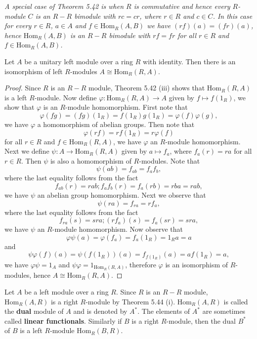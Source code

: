 \begin{note}\em
A special case of Theorem 5.42 is when $R$ is commutative and hence every $R$-module $C$ is an $R-R$ bimodule with $rc=cr$, where $r\in R$ and $c\in C$. In this case for every $r\in R$, $a\in A$ and $f\in\mathrm{Hom}_R(A,B)$ we have $(rf)(a)=(fr)(a)$, hence $\mathrm{Hom}_R(A,B)$ is an $R-R$ bimodule with $rf=fr$ for all $r\in R$ and $f\in\mathrm{Hom}_R(A,B)$.
\end{note}
\begin{theorem}
Let $A$ be a unitary left module over a ring $R$ with identity. Then there is an isomorphism of left $R$-modules $A\cong\mathrm{Hom}_R(R,A)$.
\end{theorem}
\begin{proof}
Since $R$ is an $R-R$ module, Theorem 5.42 (iii) shows that $\mathrm{Hom}_R(R,A)$ is a left $R$-module. Now define $\varphi:\mathrm{Hom}_R(R,A)\to A$ given by $f\mapsto f(1_R)$, we show that $\varphi$ is an $R$-module homomorphism. First note that 
$$
\varphi \left( fg \right) =\left( fg \right) \left( 1_R \right) =f\left( 1_R \right) g\left( 1_R \right) =\varphi \left( f \right) \varphi \left( g \right) ,
$$
we have $\varphi$ a homomorphism of abelian groups. Then note that 
$$
\varphi \left( rf \right) =rf\left( 1_R \right) =r\varphi \left( f \right) 
$$
for all $r\in R$ and $f\in\mathrm{Hom}_R(R,A)$, we have $\varphi$ an $R$-module homomorphism. Next we define $\psi:A\to\mathrm{Hom}_R(R,A)$ given by $a\mapsto f_a$, where $f_a(r)=ra$ for all $r\in R$. Then $\psi$ is also a homomorphism of $R$-modules. Note that 
$$
\psi \left( ab \right) =f_{ab}=f_af_b,
$$
where the last equality follows from the fact 
$$
f_{ab}\left( r \right) =rab;f_af_b\left( r \right) =f_a\left( rb \right) =rba=rab,
$$
we have $\psi$ an abelian group homomorphism. Next we observe that 
$$
\psi \left( ra \right) =f_{ra}=rf_a,
$$
where the last equality follows from the fact 
$$
f_{ra}\left( s \right) =sra;\left( rf_a \right) \left( s \right) =f_a\left( sr \right) =sra,
$$
we have $\psi$ an $R$-module homomorphism. Now observe that 
$$
\varphi \psi \left( a \right) =\varphi \left( f_a \right) =f_a\left( 1_R \right) =1_Ra=a
$$
and 
$$
\psi \varphi \left( f \right) \left( a \right) =\psi \left( f\left( 1_R \right) \right) \left( a \right) =f_{f\left( 1_R \right)}\left( a \right) =af\left( 1_R \right) =a,
$$
we have $\varphi\psi=1_A$ and $\psi\varphi=1_{\mathrm{Hom}_R(R,A)}$, therefore $\varphi$ is an isomorphism of $R$-modules, hence $A\cong\mathrm{Hom}_R(R,A)$.
\end{proof}
Let $A$ be a left module over a ring $R$. Since $R$ is an $R-R$ module, $\mathrm{Hom}_R(A,R)$ is a right $R$-module by Theorem 5.44 (i). $\mathrm{Hom}_R(A,R)$ is called the \textbf{dual} module of $A$ and is denoted by $A^*$. The elements of $A^*$ are sometimes called \textbf{linear functionals}. Similarly if $B$ is a right $R$-module, then the dual $B^*$ of $B$ is a left $R$-module $\mathrm{Hom}_R(B,R)$.
